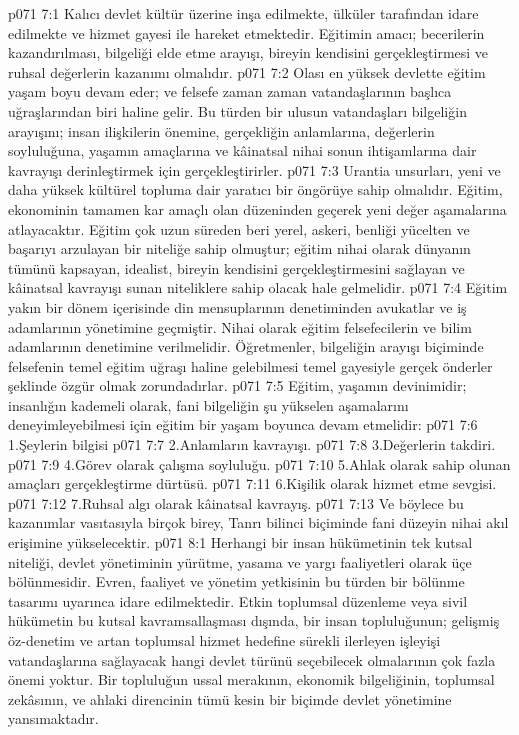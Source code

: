 \vs p071 7:1 Kalıcı devlet kültür üzerine inşa edilmekte, ülküler tarafından idare edilmekte ve hizmet gayesi ile hareket etmektedir. Eğitimin amacı; becerilerin kazandırılması, bilgeliği elde etme arayışı, bireyin kendisini gerçekleştirmesi ve ruhsal değerlerin kazanımı olmalıdır.
\vs p071 7:2 Olası en yüksek devlette eğitim yaşam boyu devam eder; ve felsefe zaman zaman vatandaşlarının başlıca uğraşlarından biri haline gelir. Bu türden bir ulusun vatandaşları bilgeliğin arayışını; insan ilişkilerin önemine, gerçekliğin anlamlarına, değerlerin soyluluğuna, yaşamın amaçlarına ve kâinatsal nihai sonun ihtişamlarına dair kavrayışı derinleştirmek için gerçekleştirirler.
\vs p071 7:3 Urantia unsurları, yeni ve daha yüksek kültürel topluma dair yaratıcı bir öngörüye sahip olmalıdır. Eğitim, ekonominin tamamen kar amaçlı olan düzeninden geçerek yeni değer aşamalarına atlayacaktır. Eğitim çok uzun süreden beri yerel, askeri, benliği yücelten ve başarıyı arzulayan bir niteliğe sahip olmuştur; eğitim nihai olarak dünyanın tümünü kapsayan, idealist, bireyin kendisini gerçekleştirmesini sağlayan ve kâinatsal kavrayışı sunan niteliklere sahip olacak hale gelmelidir.
\vs p071 7:4 Eğitim yakın bir dönem içerisinde din mensuplarının denetiminden avukatlar ve iş adamlarının yönetimine geçmiştir. Nihai olarak eğitim felsefecilerin ve bilim adamlarının denetimine verilmelidir. Öğretmenler, bilgeliğin arayışı biçiminde felsefenin temel eğitim uğraşı haline gelebilmesi temel gayesiyle gerçek önderler şeklinde özgür olmak zorundadırlar.
\vs p071 7:5 Eğitim, yaşamın devinimidir; insanlığın kademeli olarak, fani bilgeliğin şu yükselen aşamalarını deneyimleyebilmesi için eğitim bir yaşam boyunca devam etmelidir:
\vs p071 7:6 1.\bibnobreakspace Şeylerin bilgisi
\vs p071 7:7 2.\bibnobreakspace Anlamların kavrayışı.
\vs p071 7:8 3.\bibnobreakspace Değerlerin takdiri.
\vs p071 7:9 4.\bibnobreakspace Görev olarak çalışma soyluluğu.
\vs p071 7:10 5.\bibnobreakspace Ahlak olarak sahip olunan amaçları gerçekleştirme dürtüsü.
\vs p071 7:11 6.\bibnobreakspace Kişilik olarak hizmet etme sevgisi.
\vs p071 7:12 7.\bibnobreakspace Ruhsal algı olarak kâinatsal kavrayış.
\vs p071 7:13 Ve böylece bu kazanımlar vasıtasıyla birçok birey, Tanrı bilinci biçiminde fani düzeyin nihai akıl erişimine yükselecektir.
\vs p071 8:1 Herhangi bir insan hükümetinin tek kutsal niteliği, devlet yönetiminin yürütme, yasama ve yargı faaliyetleri olarak üçe bölünmesidir. Evren, faaliyet ve yönetim yetkisinin bu türden bir bölünme tasarımı uyarınca idare edilmektedir. Etkin toplumsal düzenleme veya sivil hükümetin bu kutsal kavramsallaşması dışında, bir insan topluluğunun; gelişmiş öz\hyp{}denetim ve artan toplumsal hizmet hedefine sürekli ilerleyen işleyişi vatandaşlarına sağlayacak hangi devlet türünü seçebilecek olmalarının çok fazla önemi yoktur. Bir topluluğun ussal merakının, ekonomik bilgeliğinin, toplumsal zekâsının, ve ahlaki direncinin tümü kesin bir biçimde devlet yönetimine yansımaktadır.
